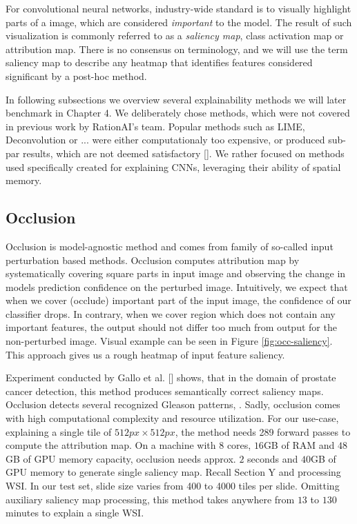For convolutional neural networks, industry-wide standard is to visually highlight parts of a image, which are considered \emph{important} to the model. The result of such visualization is commonly referred to as a \emph{saliency map}, class activation map or attribution map. There is no consensus on terminology, and we will use the term saliency map to describe any heatmap that identifies features considered significant by a post-hoc method. 


\noindent
In following subsections we overview several explainability methods we will later benchmark in Chapter 4. We deliberately chose methods, which were not covered in previous work by RationAI's team. Popular methods such as LIME, Deconvolution or ...  were either computationaly too expensive, or produced sub-par results, which are not deemed satisfactory []. We rather focused on methods used specifically created for explaining CNNs, leveraging their ability of spatial memory.



\subsection{Occlusion}

Occlusion is model-agnostic method and comes from family of so-called input perturbation based methods. Occlusion computes attribution map by systematically covering square parts in input image and observing the change in models prediction confidence on the perturbed image. Intuitively, we expect that when we cover (occlude) important part of the input image, the confidence of our classifier drops. In contrary, when we cover region which does not contain any important features, the output should not differ too much from output for the non-perturbed image. Visual example can be seen in Figure \ref{fig:occ-saliency}. This approach gives us a rough heatmap of input feature saliency.

Experiment conducted by Gallo et al. [] shows, that in the domain of prostate cancer detection, this method produces semantically correct saliency maps. Occlusion detects several recognized Gleason patterns, . Sadly, occlusion comes with high computational complexity and resource utilization. For our use-case, explaining a single tile of $512px \times 512px$, the method needs 289 forward passes to compute the attribution map. On a machine with $8$ cores, $16$GB of RAM and $48$GB of GPU memory capacity, occlusion needs approx. $2$ seconds and $40$GB of GPU memory to generate single saliency map. Recall Section Y and processing WSI. In our test set, slide size varies from 400 to 4000 tiles per slide. Omitting auxiliary saliency map processing, this method takes anywhere from $13$ to $130$ minutes to explain a single WSI.

